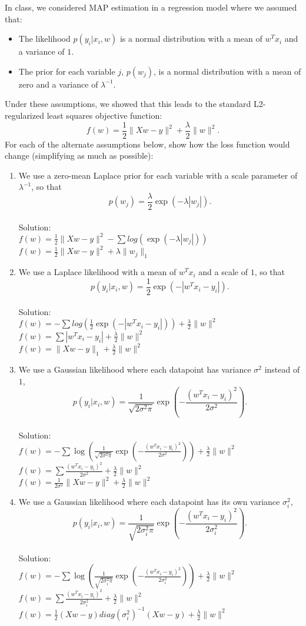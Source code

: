 \documentclass{article}
\def\blu#1{{\color{blu}#1}}
\def\gre#1{{\color{gre}#1}}
\def\norm#1{\|#1\|}
\def\items#1{\begin{itemize}#1\end{itemize}}
\def\enum#1{\begin{enumerate}#1\end{enumerate}}
\begin{document}
In class, we considered MAP estimation in a regression model where we assumed that:
\items{
\item The likelihood $p(y_i | x_i, w)$ is a normal distribution with a mean of $w^Tx_i$ and a variance of $1$.
\item The prior for each variable $j$, $p(w_j)$, is a normal distribution with a mean of zero and a variance of $\lambda^{-1}$.
}
Under these assumptions, we showed that this leads to the standard L2-regularized least squares objective function:
\[
f(w) = \frac{1}{2}\norm{Xw - y}^2 + \frac \lambda 2 \norm{w}^2.
\]
\blu{For each of the alternate assumptions below, show how the loss function would change} (simplifying as much as possible):
\enum{
\item We use a zero-mean Laplace prior for each variable with a scale parameter of $\lambda^{-1}$, so that
\[
p(w_j) = \frac{\lambda}{2}\exp(-\lambda|w_j|).
\] \\
\gre{Solution:\\
$f(w) = \frac{1}{2}\norm{Xw - y}^2 - \sum log(\exp(-\lambda|w_j|))$ \\
$f(w) = \frac{1}{2}\norm{Xw - y}^2 + \lambda \norm{w_j}_1$}
\item We use a Laplace likelihood with a mean of $w^Tx_i$ and a scale of $1$, so that
\[
p(y_i | x_i, w) = \frac 1 2 \exp(-|w^Tx_i - y_i|).
\] \\
\gre{Solution: \\
$f(w) = -\sum log(\frac{1}{2} \exp (-|w^Tx_i - y_i|)) +\frac{\lambda}{2} \norm{w}^2$ \\
$f(w) = \sum|w^Tx_i - y_i| + \frac{\lambda}{2} \norm{w}^2$ \\
$f(w) = \norm{Xw - y}_1 + \frac{\lambda}{2} \norm{w}^2$}
\item We use a Gaussian likelihood where each datapoint has variance $\sigma^2$ instead of $1$,
\[
p(y_i | x_i,w) = \frac{1}{\sqrt{2\sigma^2\pi}}\exp\left(-\frac{(w^Tx_i - y_i)^2}{2\sigma^2}\right).
\] \\
\gre{Solution: \\
$f(w) = -\sum \log(\frac{1}{\sqrt{2\sigma^2\pi}}\exp\left(-\frac{(w^Tx_i - y_i)^2}{2\sigma^2}\right))+\frac{\lambda}{2} \norm{w}^2$ \\
$f(w) = \sum \frac{(w^Tx_i - y_i)^2}{2\sigma^2} + \frac{\lambda}{2} \norm{w}^2$ \\
$f(w) = \frac{1}{2\sigma^2}\norm{Xw - y}^2 + \frac{\lambda}{2} \norm{w}^2$ }
\item We use a Gaussian likelihood where each datapoint has its own variance $\sigma_i^2$,
\[
p(y_i | x_i,w) = \frac{1}{\sqrt{2\sigma_i^2\pi}}\exp\left(-\frac{(w^Tx_i - y_i)^2}{2\sigma_i^2}\right).
\] \\
\gre{Solution: \\
$f(w) = - \sum \log(\frac{1}{\sqrt{2\sigma_i^2\pi}}\exp\left(-\frac{(w^Tx_i - y_i)^2}{2\sigma_i^2}\right)) + \frac{\lambda}{2} \norm{w}^2$ \\
$f(w) = \sum \frac{(w^Tx_i - y_i)^2}{2\sigma_i^2} + \frac{\lambda}{2} \norm{w}^2$\\
$f(w) = \frac{1}{2}(Xw-y) diag(\sigma _i ^2)^{-1} (Xw-y) + \frac{\lambda}{2} \norm{w}^2$}
}
\end{document}
